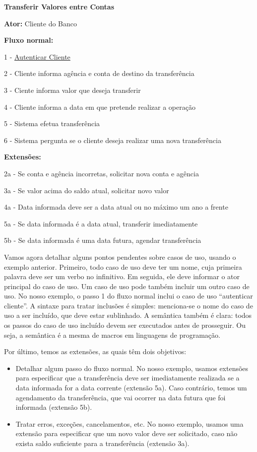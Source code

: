 \documentclass[
  11pt,
  twoside]{book}
\renewenvironment{quote}{\centering \vspace{1.5ex} \begin{tcolorbox}[colback=backcolor, width=4.9in]}{\end{tcolorbox}}
\begin{document}
\begin{quote}
\textbf{Transferir Valores entre Contas}

\textbf{Ator:} Cliente do Banco

\textbf{Fluxo normal:}

1 - \underline{Autenticar Cliente}

2 - Cliente informa agência e conta de destino da transferência

3 - Ciente informa valor que deseja transferir

4 - Cliente informa a data em que pretende realizar a operação

5 - Sistema efetua transferência

6 - Sistema pergunta se o cliente deseja realizar uma nova transferência

\textbf{Extensões:}

2a - Se conta e agência incorretas, solicitar nova conta e agência

3a - Se valor acima do saldo atual, solicitar novo valor

4a - Data informada deve ser a data atual ou no máximo um ano a frente

5a - Se data informada é a data atual, transferir imediatamente

5b - Se data informada é uma data futura, agendar transferência
\end{quote}

Vamos agora detalhar alguns pontos pendentes sobre casos de uso, usando
o exemplo anterior. Primeiro, todo caso de uso deve ter um nome, cuja
primeira palavra deve ser um verbo no infinitivo. Em seguida, ele deve
informar o ator principal do caso de uso. Um caso de uso pode também
incluir um outro caso de uso. No nosso exemplo, o passo 1 do fluxo
normal inclui o caso de uso ``autenticar cliente''. A sintaxe para
tratar inclusões é simples: menciona-se o nome do caso de uso a ser
incluído, que deve estar sublinhado. A semântica também é clara: todos
os passos do caso de uso incluído devem ser executados antes de
prosseguir. Ou seja, a semântica é a mesma de macros em linguagens de
programação.

Por último, temos as extensões, as quais têm dois objetivos:

\begin{itemize}
\item
  Detalhar algum passo do fluxo normal. No nosso exemplo, usamos
  extensões para especificar que a transferência deve ser imediatamente
  realizada se a data informada for a data corrente (extensão 5a). Caso
  contrário, temos um agendamento da transferência, que vai ocorrer na
  data futura que foi informada (extensão 5b).
\item
  Tratar erros, exceções, cancelamentos, etc. No nosso exemplo, usamos
  uma extensão para especificar que um novo valor deve ser solicitado,
  caso não exista saldo suficiente para a transferência (extensão 3a).
\end{itemize}
\end{document}
